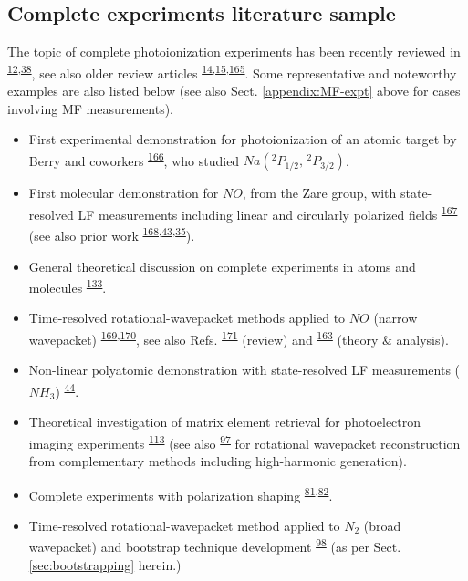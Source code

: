 \documentclass[10pt]{article}
\begin{document}
\subsection{Complete experiments literature sample\label{sec:CompleteLit}}


The topic of complete photoionization experiments has been recently reviewed in \textsuperscript{\hyperref[csl:12]{12},\hyperref[csl:38]{38}}, see also older review articles \textsuperscript{\hyperref[csl:14]{14},\hyperref[csl:15]{15},\hyperref[csl:165]{165}}. Some representative and noteworthy examples are also listed below (see also Sect. \ref{appendix:MF-expt} above for cases involving MF measurements).

\begin{itemize}
\item First experimental demonstration for photoionization of an atomic target by Berry and coworkers \textsuperscript{\hyperref[csl:166]{166}}, who studied
$Na(^{2}P_{1/2},\,^{2}P_{3/2})$.
\item First molecular demonstration for $NO$, from the Zare group, with state-resolved LF measurements including linear and circularly polarized fields \textsuperscript{\hyperref[csl:167]{167}} (see also prior work \textsuperscript{\hyperref[csl:168]{168},\hyperref[csl:43]{43},\hyperref[csl:35]{35}}).
\item General theoretical discussion on complete experiments in atoms and molecules \textsuperscript{\hyperref[csl:133]{133}}.
\item Time-resolved rotational-wavepacket methods applied to $NO$ (narrow wavepacket) \textsuperscript{\hyperref[csl:169]{169},\hyperref[csl:170]{170}}, see also Refs. \textsuperscript{\hyperref[csl:171]{171}} (review) and \textsuperscript{\hyperref[csl:163]{163}} (theory \& analysis).
\item Non-linear polyatomic demonstration with state-resolved LF measurements ($NH_3$) \textsuperscript{\hyperref[csl:44]{44}}.
\item Theoretical investigation of matrix element retrieval for photoelectron imaging experiments \textsuperscript{\hyperref[csl:113]{113}} (see also \textsuperscript{\hyperref[csl:97]{97}} for rotational wavepacket reconstruction from complementary methods including high-harmonic generation).  
\item Complete experiments with polarization shaping \textsuperscript{\hyperref[csl:81]{81},\hyperref[csl:82]{82}}.
\item Time-resolved rotational-wavepacket method applied to $N_2$ (broad wavepacket) and bootstrap technique development \textsuperscript{\hyperref[csl:98]{98}} (as per Sect. \ref{sec:bootstrapping} herein.)
\end{itemize} 
\end{document}
